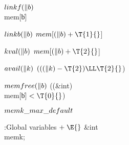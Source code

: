 \Y\B\4\D$\\{linkf}(\|b)$ \5
\\{mem}[\|b]\par
\B\4\D$\\{linkb}(\|b)$ \5
$\\{mem}[(\|b)+\T{1}{}$]\par
\B\4\D$\\{kval}(\|b)$ \5
$\\{mem}[(\|b)+\T{2}{}$]\par
\B\4\D$\\{avail}(\|k)$ \5
$(((\|k)-\T{2})\LL\T{2}{}$)\par
\B\4\D$\\{memfree}(\|b)$ \5
((\&{int}) \\{mem}[\|b]${}<\T{0}{}$)\par
\B\4\D$\\{memk\_max\_default}$ \5
\par
\Y\B\4:Global variables\X${}\mathrel+\E{}$\6
\&{int} \\{memk};\par
\fi

